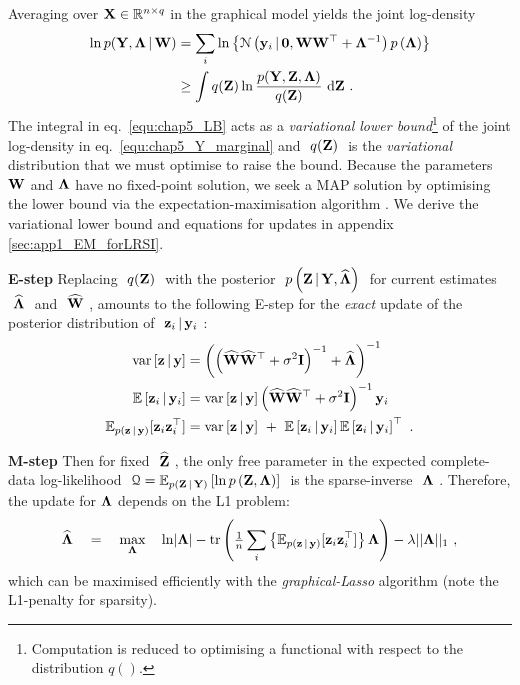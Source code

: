       Averaging over $\mathbf{X} \in \mathbb{R}^{n \times q}$ in the graphical model yields the joint log-density
      \begin{align}
        \label{equ:chap5_Y_marginal} \ln p(\mathbf{Y},\mathbf{\Lambda} \,|\, \mathbf{W}) &= \sum_{i} \ln \left\{ \mathcal{N} \left(  \mathbf{y}_{i} \,|\, \mathbf{0} ,  \mathbf{W} \mathbf{W}^\top + \mathbf{\Lambda}^{-1}  \right) p \left( \mathbf{\Lambda} \right) \right\} \\
        \label{equ:chap5_LB} &\geq \int q(\mathbf{Z}) \ln \frac{p(\mathbf{Y},\mathbf{Z},\mathbf{\Lambda})}{q(\mathbf{Z})} ~ \textrm{d}\mathbf{Z} ~.
      \end{align}
      The integral in eq.~\eqref{equ:chap5_LB} acts as a \textit{variational lower bound}\footnote{Computation is reduced to optimising a functional with respect to the distribution $q()$.} of the joint log-density in eq.~\eqref{equ:chap5_Y_marginal} and $~q(\mathbf{Z})~$ is the \textit{variational} distribution that we must optimise to raise the bound. Because the parameters $\mathbf{W}$ and $\mathbf{\Lambda}$ have no fixed-point solution, we seek a MAP solution by optimising the lower bound via the expectation-maximisation algorithm \citep[EM,][]{Lawrence:licsb10, Dempster:EM77}. We derive the variational lower bound and equations for updates in appendix \ref{sec:app1_EM_forLRSI}. 

      \textbf{E-step} Replacing $~q(\mathbf{Z})~$ with the posterior $~p\left(\mathbf{Z}\,|\,\mathbf{Y},\widehat{\mathbf{\Lambda}}\right)~$ for current estimates $~\widehat{\mathbf{\Lambda}}~$ and $~\widehat{\mathbf{W}}~$, amounts to the following E-step for the \emph{exact} update of the posterior distribution of $~\mathbf{z}_i\,|\,\mathbf{y}_i~$:
      \begin{align}
        \label{equ:chap5_Estep1} \textrm{var}\left[\mathbf{z} \,|\, \mathbf{y}\right] &= \left( \left( \widehat{\mathbf{W}}\widehat{\mathbf{W}}^\top + \sigma^2\mathbf{I} \right)^{-1} + \widehat{\mathbf{\Lambda}} \right)^{-1} \\
        \label{equ:chap5_Estep2} \mathbb{E}\left[ \mathbf{z}_i \,|\, \mathbf{y}_i \right] &= \textrm{var}\left[\mathbf{z} \,|\, \mathbf{y}\right] \left ( \widehat{\mathbf{W}} \widehat{\mathbf{W}}^\top + \sigma^2 \mathbf{I} \right)^{-1} \mathbf{y}_i \\
        \label{eq:Avg_E_fft} \mathbb{E}_{p(\mathbf{z}\,|\,\mathbf{y})}[ \mathbf{z}_i \mathbf{z}_i^\top ] &= \textrm{var}\left[ \mathbf{z} \,|\, \mathbf{y} \right] ~+~ \mathbb{E}\left[ \mathbf{z}_i \,|\, \mathbf{y}_i \right] \mathbb{E}\left[ \mathbf{z}_i \,|\, \mathbf{y}_i \right]^\top ~.
      \end{align}
     
      \textbf{M-step} Then for fixed $~\widehat{\mathbf{Z}}~$, the only free parameter in the expected complete-data log-likelihood $~\mathcal{Q} = \mathbb{E}_{p(\mathbf{Z}\,|\,\mathbf{Y})} \left[ \ln p \left( \mathbf{Z}, \mathbf{\Lambda} \right) \right]~$ is the sparse-inverse $~\mathbf{\Lambda}~$. Therefore, the update for $\mathbf{\Lambda}$ depends on the L1 problem:
      \begin{align} \label{equ:chap5_Mstep}
        \widehat{\mathbf{\Lambda}} \quad = \quad \underset{\mathbf{\Lambda}}{\textrm{max}} \quad \ln \lvert \mathbf{\Lambda} \rvert - \textrm{tr} \left(  \tfrac{1}{n}\sum_i \left\{ \mathbb{E}_{p(\mathbf{z}\,|\,\mathbf{y})}[ \mathbf{z}_i \mathbf{z}_i^\top ] \right\} \mathbf{\Lambda} \right) - \lambda \vert\vert \mathbf{\Lambda} \vert\vert_1 ~,
      \end{align}
      which can be maximised efficiently with the \textit{graphical-Lasso} algorithm \citep[GLasso,][]{Friedman:sparse08, Banerjee:model2008} (note the L1-penalty for sparsity).
     
